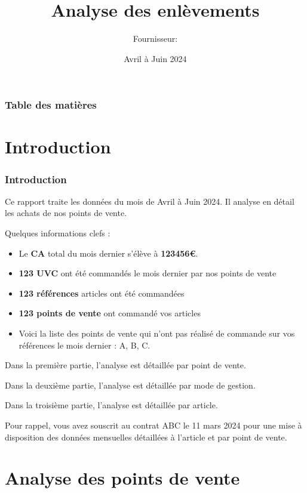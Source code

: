 \documentclass{beamer}
\title{Analyse des enlèvements}
\author{Fournisseur: \textbf{}}
\date{Avril à Juin 2024}
\begin{document}
    \begin{frame}
        \titlepage
    \end{frame}

    \begin{frame}
        \frametitle{Table des matières}
        \tableofcontents
    \end{frame}

    \section{Introduction}

    \begin{frame}
        \tiny
        \frametitle{Introduction}
        Ce rapport traite les données du mois de Avril à Juin 2024. Il analyse en détail les achats de nos points de vente.\par

        Quelques informations clefs :

        \begin{itemize}
            \item{Le \textbf{CA} total du mois dernier s’élève à \textbf{123456€}.}
            \item{\textbf{123 UVC} ont été commandés le mois dernier par nos points de vente}
            \item{\textbf{123 références} articles ont été commandées}
            \item{\textbf{123 points de vente} ont commandé vos articles}
            \item{Voici la liste des points de vente qui n’ont pas réalisé de commande sur vos références le mois dernier : A, B, C.}
        \end{itemize}

        Dans la première partie, l’analyse est détaillée par point de vente.\par
        Dans la deuxième partie, l’analyse est détaillée par mode de gestion.\par
        Dans la troisième partie, l’analyse est détaillée par article.\par
        Pour rappel, vous avez souscrit au contrat ABC le 11 mars 2024 pour une mise à disposition des données mensuelles détaillées à l’article et par point de vente.\par
    \end{frame}

    \section{Analyse des points de vente}
\end{document}
